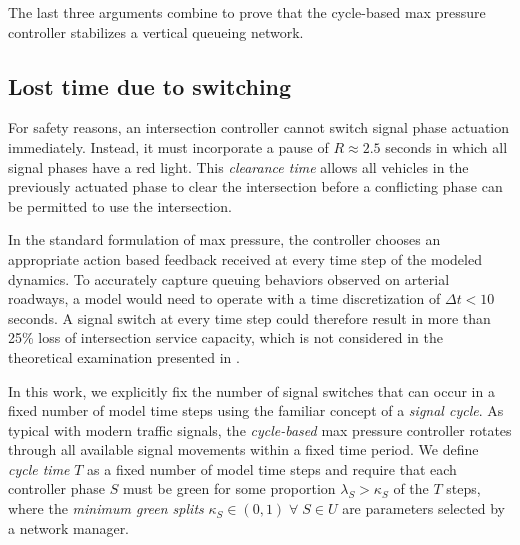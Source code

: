 The last three arguments combine to prove that the cycle-based max pressure controller stabilizes a vertical queueing network. 

%



 
\subsection*{Lost time due to switching}
For safety reasons, an intersection controller cannot switch signal phase actuation immediately. Instead, it must incorporate a pause of $R\approx2.5$ seconds in which all signal phases have a red light. This \emph{clearance time} allows all vehicles in the previously actuated phase to clear the intersection before a conflicting phase can be permitted to use the intersection. 

In the standard formulation of max pressure, the controller chooses an appropriate action based feedback received at every time step of the modeled dynamics. To accurately capture queuing behaviors observed on arterial roadways, a model would need to operate with a time discretization of $\Delta t< 10$ seconds. A signal switch at every time step could therefore result in more than 25\% loss of intersection service capacity, which is not considered in the theoretical examination presented in \cite{MaxPressureStochastic}. 

In this work, we explicitly fix the number of signal switches that can occur in a fixed number of model time steps using the familiar concept of a \emph{signal cycle}. As typical with modern traffic signals, the \emph{cycle-based} max pressure controller rotates through all available signal movements within a fixed time period. We define \emph{cycle time} $T$ as a fixed number of model time steps and require that each controller phase $S$ must be green for some proportion $\lambda_S > \kappa_S$ of the $T$ steps, where the \emph{minimum green splits} $\kappa_S \in (0,1) \; \forall \; S \in U $ are parameters selected by a network manager.  

